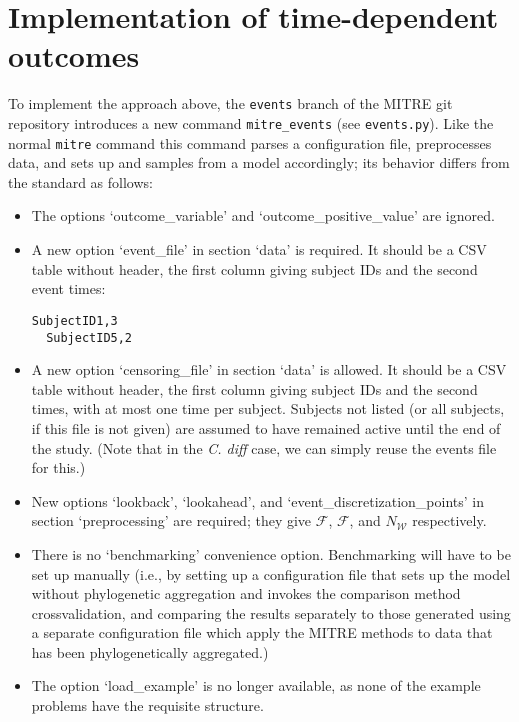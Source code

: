 \documentclass[12pt]{article}
\begin{document}
\section{Implementation of time-dependent outcomes}

To implement the approach above, the \texttt{events} branch of the MITRE git repository
introduces a new command \texttt{mitre\_events} (see \texttt{events.py}). Like the normal
\texttt{mitre} command this command parses a configuration file, preprocesses data, and sets up and samples
from a model accordingly; its behavior differs from the standard as follows:
\begin{itemize}
\item The options `outcome\_variable' and `outcome\_positive\_value' are ignored.
\item A new option `event\_file' in section `data' is required. It should
  be a CSV table without header, the first column giving subject IDs and the second event times:

\begin{lstlisting}[caption=Example events file]
  SubjectID1,3
  SubjectID5,2
\end{lstlisting}

\item A new option `censoring\_file' in section `data' is allowed. It
  should be a CSV table without header, the first column giving
  subject IDs and the second times, with at most one time per subject.
  Subjects not listed (or all subjects, if this file is not given) are
  assumed to have remained active until the end of the study.  (Note
  that in the \textit{C. diff} case, we can simply reuse the events
  file for this.)

\item New options `lookback', `lookahead', and
  `event\_discretization\_points' in section `preprocessing' are
  required; they give $\mathcal F$, $\mathcal F$, and $N_\mathcal W$
  respectively.

\item There is no `benchmarking' convenience option. Benchmarking will
  have to be set up manually (i.e., by setting up a configuration file
  that sets up the model without phylogenetic aggregation and invokes
  the comparison method crossvalidation, and comparing the results
  separately to those generated using a separate configuration file
  which apply the MITRE methods to data that has been phylogenetically
  aggregated.)

\item The option `load\_example' is no longer available, as none of the example
  problems have the requisite structure.
  

\end{itemize}
\end{document}
